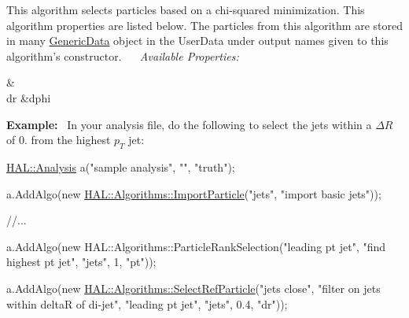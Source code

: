 This algorithm selects particles based on a chi-\/squared minimization. This algorithm properties are listed below. The particles from this algorithm are stored in many \hyperlink{class_h_a_l_1_1_generic_data}{Generic\+Data} object in the User\+Data under output names given to this algorithm's constructor.~\newline
~\newline
{\itshape Available Properties\+:} \begin{TabularC}{2}
\hline
{}\PBS{}&\PBS\centering {\bf $ \Delta\phi $  }\\
\PBS\centering dr &\PBS\centering dphi \\
\end{TabularC}
{\bfseries Example\+:}~\newline
In your analysis file, do the following to select the jets within a $ \Delta R $ of 0. from the highest $ p_T $ jet\+:


\begin{DoxyCode}
\hyperlink{class_h_a_l_1_1_analysis}{HAL::Analysis} a(\textcolor{stringliteral}{"sample analysis"}, \textcolor{stringliteral}{""}, \textcolor{stringliteral}{"truth"});

a.AddAlgo(\textcolor{keyword}{new} \hyperlink{class_h_a_l_1_1_algorithms_1_1_import_particle}{HAL::Algorithms::ImportParticle}(\textcolor{stringliteral}{"jets"}, \textcolor{stringliteral}{"import basic jets"}));

\textcolor{comment}{//...}

a.AddAlgo(\textcolor{keyword}{new} HAL::Algorithms::ParticleRankSelection(\textcolor{stringliteral}{"leading pt jet"}, \textcolor{stringliteral}{"find highest pt jet"}, 
                                                     \textcolor{stringliteral}{"jets"},
                                                     1, \textcolor{stringliteral}{"pt"}));

a.AddAlgo(\textcolor{keyword}{new} \hyperlink{class_h_a_l_1_1_algorithms_1_1_select_ref_particle}{HAL::Algorithms::SelectRefParticle}(\textcolor{stringliteral}{"jets close"}, \textcolor{stringliteral}{"filter on
       jets within deltaR of di-jet"}, 
                                                 \textcolor{stringliteral}{"leading pt jet"}, \textcolor{stringliteral}{"jets"},
                                                 0.4, \textcolor{stringliteral}{"dr"}));
\end{DoxyCode}
 

